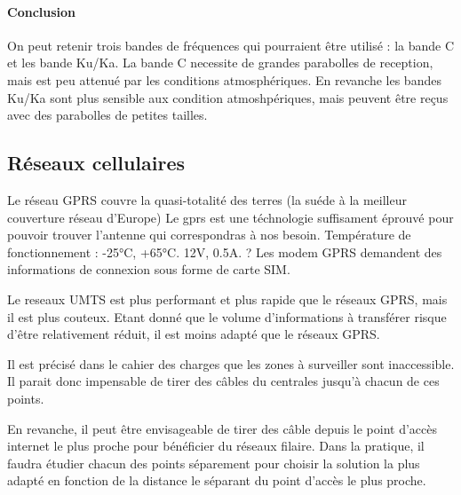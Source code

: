             \paragraph{Conclusion}
                On peut retenir trois bandes de fréquences qui pourraient être utilisé : la bande C et les bande Ku/Ka.
                La bande C necessite de grandes parabolles de reception, mais est peu attenué par les conditions atmosphériques.
                En revanche les bandes Ku/Ka sont plus sensible aux condition atmoshpériques, mais peuvent être reçus avec des parabolles de petites tailles.

        \subsection{Réseaux cellulaires}

                {Le réseau GPRS couvre la quasi-totalité des terres (la suéde à la meilleur couverture réseau d'Europe)
                Le gprs est une téchnologie suffisament éprouvé pour pouvoir trouver l'antenne qui correspondras à nos besoin.}
                {Température de fonctionnement : -25°C, +65°C.
                }
                {12V, 0.5A.
                }
                {?
                }
                {Les modem GPRS demandent des informations de connexion sous forme de carte SIM.
                }
                {
                }


                {Le reseaux UMTS est plus performant et plus rapide que le réseaux GPRS, mais il est plus couteux.
                Etant donné que le volume d'informations à transférer risque d'être relativement réduit, il est moins adapté que le réseaux GPRS.}
                {
                }
                {
                }
                {
                }
                {
                }
                {
                }
                    
                {Il est précisé dans le cahier des charges que les zones à surveiller sont inaccessible.
                 Il parait donc impensable de tirer des câbles du centrales jusqu'à chacun de ces points.

                 En revanche, il peut être envisageable de tirer des câble depuis le point d'accès internet le plus proche pour bénéficier du réseaux filaire.
                 Dans la pratique, il faudra étudier chacun des points séparement pour choisir la solution la plus adapté en fonction de la distance le séparant du point d'accès le plus proche.}
                {
                }
                {
                }
                {
                }
                {
                }
                {
                }
            
